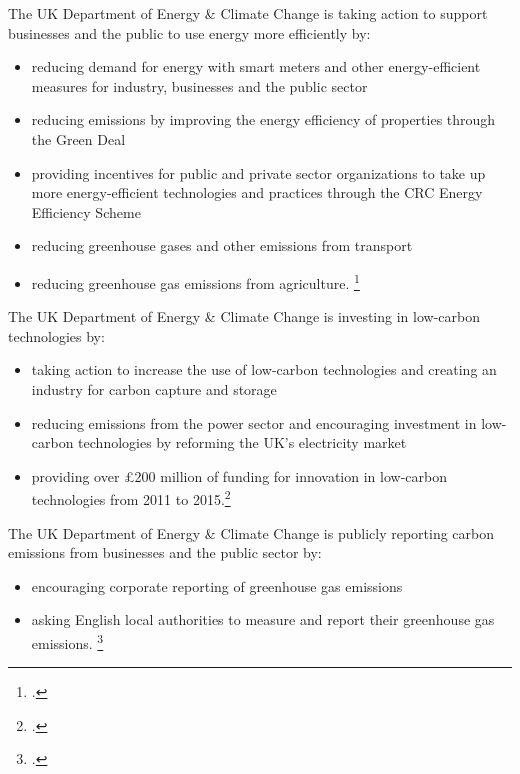The UK Department of Energy \& Climate Change is taking action to support businesses and the public to use energy more efficiently by:
\begin{itemize}
	\item reducing demand for energy with smart meters and other energy-efficient measures for industry, businesses and the public sector
	\item reducing emissions by improving the energy efficiency of properties through the Green Deal
	\item providing incentives for public and private sector organizations to take up more energy-efficient technologies and practices through the CRC Energy Efficiency Scheme 
	\item reducing greenhouse gases and other emissions from transport
	\item reducing greenhouse gas emissions from agriculture. \footcite[][]{UKgovnt}
\end{itemize}



The UK Department of Energy \& Climate Change is investing in low-carbon technologies by:
\begin{itemize}
	\item taking action to increase the use of low-carbon technologies and creating an industry for carbon capture and storage
	\item reducing emissions from the power sector and encouraging investment in low-carbon technologies by reforming the UK’s electricity market
	\item providing over £200 million of funding for innovation in low-carbon technologies from 2011 to 2015.\footcite[][]{UKgovnt}
\end{itemize}



The UK Department of Energy \& Climate Change is publicly reporting carbon emissions from businesses and the public sector by:
\begin{itemize}
	\item encouraging corporate reporting of greenhouse gas emissions
	\item asking English local authorities to measure and report their greenhouse gas emissions. \footcite[][]{UKgovnt}
\end{itemize}
